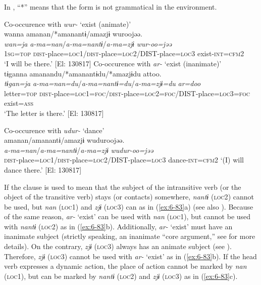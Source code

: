 In , “*” means that the form is not grammatical in the environment.

\ea\label{ex:6-83}
 \ea Co-occurence with \textit{wur-} ‘exist (animate)’\\

{\TM}
\glll wanna  amanan/*amanantɨ/amazjɨ  wuroojəə.\\
\textit{wan=ja}  \textit{a-ma=nan}/\textit{a-ma=nantɨ}/\textit{a-ma=zjɨ}  \textit{wur-oo=jəə}\\
    1\textsc{sg}=\textsc{top}  \textsc{dist}-place=\textsc{loc1}/\textsc{dist}-place=\textsc{loc2}/DIST-place=\textsc{loc3}  exist-\textsc{int}=\textsc{cfm}2\\
\glt    ‘I will be there.’ [El: 130817]
\ex Co-occurence with \textit{ar-} ‘exist (inanimate)’\\

{\TM}
\glll tɨganna  amanandu/*amanantɨdu/*amazjɨdu    attoo.  \\
\textit{tɨgan=ja}  \textit{a-ma=nan=du}/\textit{a-ma=nantɨ=du}/\textit{a-ma=zjɨ=du}   \textit{ar=doo}  \\
    letter=\textsc{top}  \textsc{dist}-place=\textsc{loc1}=\textsc{foc}/\textsc{dist}-place=\textsc{loc2}=\textsc{foc}/DIST-place=\textsc{loc3}=\textsc{foc}   exist=\textsc{ass}\\
\glt    ‘The letter is there.’ [El: 130817]

\ex Co-occurence with \textit{udur-} ‘dance’\\
{\TM}
\glll *amanan/amanantɨ/amazjɨ  wuduroojəə.\\
\textit{a-ma=nan}/\textit{a-ma=nantɨ}/\textit{a-ma=zjɨ}  \textit{wudur-oo=jəə}\\
    \textsc{dist}-place=\textsc{loc1}/\textsc{dist}-place=\textsc{loc2}/DIST-place=\textsc{loc3}  dance-\textsc{int}=\textsc{cfm}2
 \glt    ‘(I) will dance there.’ [El: 130817]
\z
\z

If the clause is used to mean that the subject of the intransitive verb (or the object of the transitive verb) stays (or contacts) somewhere, \textit{nantɨ} (\textsc{loc2}) cannot be used, but \textit{nan} (\textsc{loc1}) and \textit{zjɨ} (\textsc{loc3}) can as in (\ref{ex:6-83}a) (see also ). Because of the same reason, \textit{ar-} ‘exist’ can be used with \textit{nan} (\textsc{loc1}), but cannot be used with \textit{nantɨ} (\textsc{loc2}) as in (\ref{ex:6-83}b). Additionally, \textit{ar-} ‘exist’ must have an inanimate subject (strictly speaking, an inanimate “core argument,” see  for more details). On the contrary, \textit{zjɨ} (\textsc{loc3}) always has an animate subject (see ). Therefore, \textit{zjɨ} (\textsc{loc3}) cannot be used with \textit{ar-} ‘exist’ as in (\ref{ex:6-83}b). If the head verb expresses a dynamic action, the place of action cannot be marked by \textit{nan} (\textsc{loc1}), but can be marked by \textit{nantɨ} (\textsc{loc2}) and \textit{zjɨ} (\textsc{loc3}) as in (\ref{ex:6-83}c).

